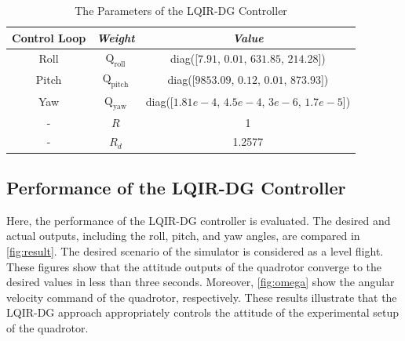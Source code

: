 \documentclass[conference]{IEEEtran}
\begin{document}
\begin{table}[!h]
	\renewcommand{\arraystretch}{1.3}
	\caption{The Parameters of the LQIR-DG Controller}
	\begin{center}
	\begin{tabular}{c c c}
	\hline
	\textbf{Control Loop} & \textbf{\textit{Weight}}& \textbf{\textit{Value}} \\
	\hline
	Roll & 
	$\boldsymbol{{\mathrm{Q_{\text{roll}}}}}$ & diag([$7.91$, $0.01$, $631.85$, $214.28$])\\
	Pitch & 
	$\boldsymbol{{\mathrm{Q_{\text{pitch}}}}}$ & diag([$9853.09$, $0.12$, $0.01$, $873.93$])\\
	Yaw & 
	$\boldsymbol{{\mathrm{Q_{\text{yaw}}}}}$ & diag([$1.81e\!-\!4$, $4.5e\!-\!4$, $3e\!-\!6$, $1.7e\!-\!5$])\\
	-& $R$ & 1\\
	-& $R_{d}$ & 1.2577\\
	\hline
	\end{tabular}
	\end{center}
	\label{tab:control weight_new}
\end{table}


\subsection{Performance of the LQIR-DG Controller}

\noindent Here,
the performance of the LQIR-DG controller is evaluated. The desired and actual outputs, including the roll, pitch, and yaw angles, are compared in \figurename{\ref{fig:result}}. The desired scenario of the simulator is considered as a level flight. These figures show that the attitude outputs of the quadrotor converge to the desired values in less than three seconds. Moreover, \figurename{\ref{fig:omega}} show the angular velocity command of the quadrotor, 
respectively. These results illustrate that the LQIR-DG approach appropriately controls the attitude of the experimental setup of the quadrotor.
\end{document}
